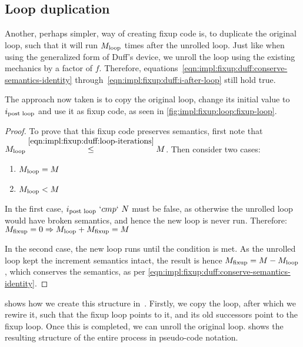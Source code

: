 







\subsection{Loop duplication}\label{sec:impl:fixup:loop}

Another, perhaps simpler, way of creating fixup code is, to duplicate the original loop, such that it will run $M_{\text{loop}}$ times after the unrolled loop.
Just like when using the generalized form of Duff's device, we unroll the loop using the existing mechanics by a factor of $f$.
Therefore, equations~\ref{eqn:impl:fixup:duff:conserve-semantics-identity} through~\ref{eqn:impl:fixup:duff:i-after-loop} still hold true.

The approach now taken is to copy the original loop, change its initial value to $i_\text{post loop}$ and use it as fixup code, as seen in \cref{fig:impl:fixup:loop:fixup-loop}.



\begin{proof}
    To prove that this fixup code preserves semantics, first note that $M_{\text{loop}} \overset{\ref{eqn:impl:fixup:duff:loop-iterations}}{\leq} M$.
    Then consider two cases:
    \begin{enumerate}
        \item $M_{\text{loop}} = M$
        \item $M_{\text{loop}} < M$
    \end{enumerate}
    In the first case, $i_\text{post loop}~`cmp`~N$ must be false, as otherwise the unrolled loop would have broken semantics, and hence the new loop is never run.
    Therefore: $M_{\text{fixup}} = 0 \Rightarrow M_{\text{loop}} + M_{\text{fixup}} = M$

    In the second case, the new loop runs until the condition is met.
    As the unrolled loop kept the increment semantics intact, the result is hence $M_{\text{fixup}} = M - M_{\text{loop}}$, which conserves the semantics, as per \cref{eqn:impl:fixup:duff:conserve-semantics-identity}.
\end{proof}

 shows how we create this structure in~\libFIRM.
Firstly, we copy the loop, after which we rewire it, such that the fixup loop points to it, and its old successors point to the fixup loop.
Once this is completed, we can unroll the original loop.
 shows the resulting structure of the entire process in pseudo-code notation.

